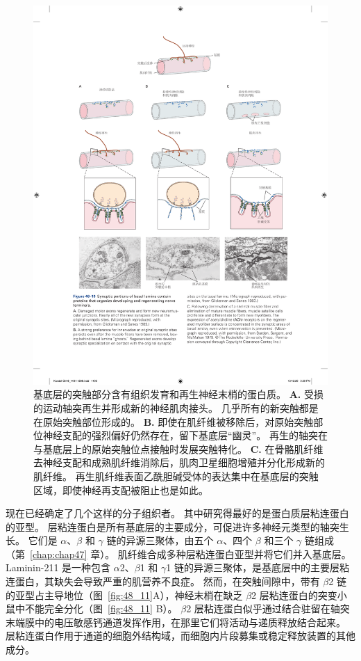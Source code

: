 \begin{figure}[htbp]
	\centering
	\includegraphics[width=0.9\linewidth]{chap48/fig_48_10}
	\caption{基底层的突触部分含有组织发育和再生神经末梢的蛋白质。
		\textbf{A.} 受损的运动轴突再生并形成新的神经肌肉接头。
		几乎所有的新突触都是在原始突触部位形成的\cite{glicksman1983differentiation}。
		\textbf{B.} 即使在肌纤维被移除后，对原始突触部位神经支配的强烈偏好仍然存在，留下基底层“幽灵”。 
		再生的轴突在与基底层上的原始突触位点接触时发展突触特化\cite{glicksman1983differentiation}。
		\textbf{C.} 在骨骼肌纤维去神经支配和成熟肌纤维消除后，肌肉卫星细胞增殖并分化形成新的肌纤维。
		再生肌纤维表面乙酰胆碱受体的表达集中在基底层的突触区域，即使神经再支配被阻止也是如此\cite{burden1979acetylcholine}。}
	\label{fig:48_10}
\end{figure}


现在已经确定了几个这样的分子组织者。
其中研究得最好的是蛋白质层粘连蛋白的亚型。
层粘连蛋白是所有基底层的主要成分，可促进许多神经元类型的轴突生长。
它们是 $ \alpha $、$ \beta $ 和 $ \gamma $ 链的异源三聚体，由五个 $ \alpha $、四个 $ \beta $ 和三个 $ \gamma $ 链组成（第~\ref{chap:chap47} 章）。
肌纤维合成多种层粘连蛋白亚型并将它们并入基底层。
Laminin-211 是一种包含 $ \alpha $2、$ \beta $1 和 $ \gamma $1 链的异源三聚体，是基底层中的主要层粘连蛋白，其缺失会导致严重的肌营养不良症。
然而，在突触间隙中，带有 $ \beta $2 链的亚型占主导地位（图~\ref{fig:48_11}A），神经末梢在缺乏 $ \beta $2 层粘连蛋白的突变小鼠中不能完全分化（图~\ref{fig:48_11} B）。 
$ \beta $2 层粘连蛋白似乎通过结合驻留在轴突末端膜中的电压敏感钙通道发挥作用，在那里它们将活动与递质释放结合起来。
层粘连蛋白作用于通道的细胞外结构域，而细胞内片段募集或稳定释放装置的其他成分。


